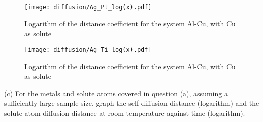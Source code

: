 \begin{figure}[h]
    \centering
    \texttt{[image: diffusion/Ag\_Pt\_log(x).pdf]}
    \caption{Logarithm of the distance coefficient for the system Al-Cu, with Cu as solute}
    \label{fig:enter-label}
\end{figure}

\begin{figure}[h]
    \centering
    \texttt{[image: diffusion/Ag\_Ti\_log(x).pdf]}
    \caption{Logarithm of the distance coefficient for the system Al-Cu, with Cu as solute}
    \label{fig:enter-label}
\end{figure}

(c) For the metals and solute atoms covered in question (a), assuming a sufficiently large sample size, graph the self-diffusion distance (logarithm) and the solute atom diffusion distance at room temperature against time (logarithm).
